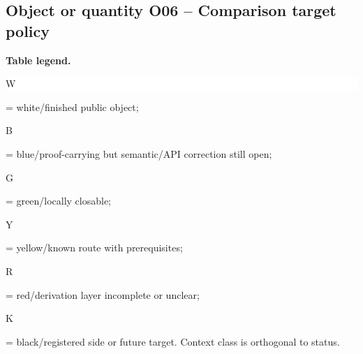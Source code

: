 \subsection*{Object or quantity O06 -- Comparison target policy}
\hypertarget{objproof:O06}{}
\par\smallskip\noindent\begin{minipage}{0.99\linewidth}\footnotesize\raggedright\textbf{Table legend.} \colorbox{white}{\strut W} = white/finished public object; \colorbox{cyan!20}{\strut B} = blue/proof-carrying but semantic/API correction still open; \colorbox{green!18}{\strut G} = green/locally closable; \colorbox{yellow!25}{\strut Y} = yellow/known route with prerequisites; \colorbox{red!20}{\strut R} = red/derivation layer incomplete or unclear; \colorbox{black!18}{\strut K} = black/registered side or future target. Context class is orthogonal to status.\end{minipage}\par\vspace{0.25em}
